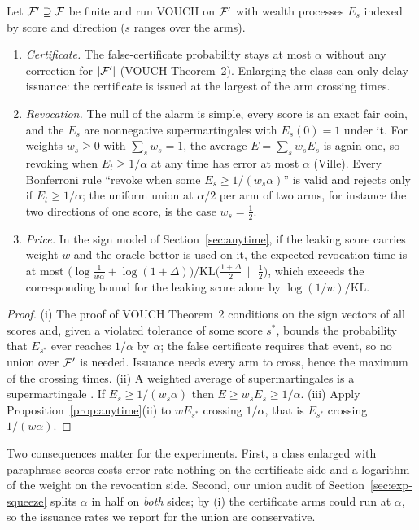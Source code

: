 \begin{proposition}\label{prop:class}
Let $\mathcal{F}'\supseteq\mathcal{F}$ be finite and run VOUCH on $\mathcal{F}'$ with wealth processes $E_s$ indexed by
score and direction ($s$ ranges over the arms).
\begin{enumerate}
\item[(i)] \emph{Certificate.} The false-certificate probability stays at most $\alpha$
without any correction for $|\mathcal{F}'|$ (VOUCH Theorem~2). Enlarging the class can only delay
issuance: the certificate is issued at the largest of the arm crossing times.
\item[(ii)] \emph{Revocation.} The null of the alarm is simple, every score is an exact
fair coin, and the $E_s$ are nonnegative supermartingales with $E_s(0)=1$ under it. For
weights $w_s\ge0$ with $\sum_sw_s=1$, the average $E=\sum_sw_sE_s$ is again one, so
revoking when $E_t\ge1/\alpha$ at any time has error at most $\alpha$ (Ville). Every
Bonferroni rule ``revoke when some $E_s\ge1/(w_s\alpha)$'' is valid and rejects only if
$E_t\ge1/\alpha$; the uniform union at $\alpha/2$ per arm of two arms, for instance the two directions of one
score, is the case $w_s=\frac12$.
\item[(iii)] \emph{Price.} In the sign model of Section~\ref{sec:anytime}, if the leaking
score carries weight $w$ and the oracle bettor is used on it, the expected revocation time
is at most $\bigl(\log\frac1{w\alpha}+\log(1+\Delta)\bigr)/\mathrm{KL}\bigl(\frac{1+\Delta}2
\,\big\|\,\frac12\bigr)$, which exceeds the corresponding bound for the leaking score alone
by $\log(1/w)/\mathrm{KL}$.
\end{enumerate}
\end{proposition}

\begin{proof}
(i) The proof of VOUCH Theorem~2 conditions on the sign vectors of all scores and, given a
violated tolerance of some score $s^\ast$, bounds the probability that $E_{s^\ast}$ ever
reaches $1/\alpha$ by $\alpha$; the false certificate requires that event, so no union
over $\mathcal{F}'$ is needed. Issuance needs every arm to cross, hence the maximum of the crossing
times. (ii) A weighted average of supermartingales is a supermartingale
\citep[the merging of e-values by averaging;][]{vovk2021evalues}. If
$E_s\ge1/(w_s\alpha)$ then $E\ge w_sE_s\ge1/\alpha$. (iii) Apply
Proposition~\ref{prop:anytime}(ii) to $w E_{s^\ast}$ crossing $1/\alpha$, that is
$E_{s^\ast}$ crossing $1/(w\alpha)$.
\end{proof}

Two consequences matter for the experiments. First, a class enlarged with paraphrase scores
costs error rate nothing on the certificate side and a logarithm of the weight on the
revocation side. Second, our union audit of Section~\ref{sec:exp-squeeze} splits $\alpha$ in
half on \emph{both} sides; by (i) the certificate arms could run at $\alpha$, so the
issuance rates we report for the union are conservative.
